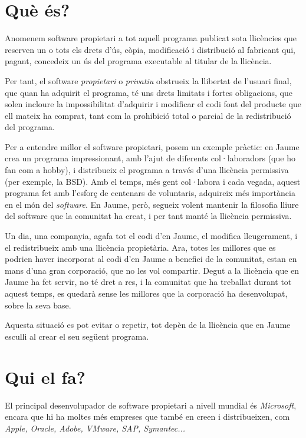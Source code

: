 \section{Què és?}

	Anomenem software propietari a tot aquell programa publicat sota llicències
	que reserven un o tots els drets d'ús, còpia, modificació i distribució
	al fabricant qui, pagant, concedeix un ús del programa executable al titular
	de la llicència.

	Per tant, el software \emph{propietari} o \emph{privatiu} obstrueix la llibertat
	de l'usuari final, que quan ha adquirit el programa, té uns drets limitats i fortes
	obligacions, que solen incloure la impossibilitat d'adquirir i modificar el codi font del producte
	que ell mateix ha comprat, tant com la prohibició total o parcial de la redistribució del programa.
	\cite{gnucategories}

	Per a entendre millor el software propietari, posem un exemple pràctic:	en Jaume crea un programa impressionant, amb l'ajut de diferents col·laboradors (que ho fan com a hobby),
	i distribueix el programa a través d'una llicència permissiva (per exemple, la BSD). Amb el temps, més gent col·labora i cada vegada,
	aquest programa fet amb l'esforç de centenars de voluntaris, adquireix més importància en el món del \emph{software}.
	En Jaume, però, segueix volent mantenir la filosofia lliure del software que la comunitat ha creat, i per tant
	manté la llicència permissiva.
	
	Un dia, una companyia, agafa tot el codi d'en Jaume, el modifica lleugerament, i
	el redistribueix amb una llicència propietària. Ara, totes les millores que es podrien haver incorporat
	al codi d'en Jaume a benefici de la comunitat, estan en mans d'una gran corporació, que no les vol compartir.
	Degut a la llicència que en Jaume ha fet servir, no té dret a res, i la comunitat que ha treballat durant tot aquest temps,
	es quedarà sense les millores que la corporació ha desenvolupat, sobre la seva base.
	
	Aquesta situació es pot evitar o repetir, tot depèn de la llicència que en Jaume esculli al crear el seu següent programa.

\section{Qui el fa?}

	El principal desenvolupador de software propietari a nivell mundial és \emph{Microsoft}, encara que hi
	ha moltes més empreses que també en creen i distribueixen, com \emph{Apple, Oracle, Adobe, VMware,
	SAP, Symantec...} \cite{propietariempreses}

